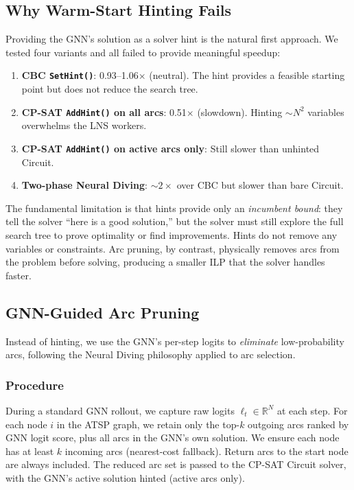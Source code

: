 \documentclass[conference]{IEEEtran}
\begin{document}
\subsection{Why Warm-Start Hinting Fails}\label{sec:hint_fail}

Providing the GNN's solution as a solver hint is the natural first approach. We tested four variants and all failed to provide meaningful speedup:

\begin{enumerate}
\item \textbf{CBC \texttt{SetHint()}}: 0.93--1.06$\times$ (neutral). The hint provides a feasible starting point but does not reduce the search tree.
\item \textbf{CP-SAT \texttt{AddHint()} on all arcs}: 0.51$\times$ (slowdown). Hinting ${\sim}N^2$ variables overwhelms the LNS workers.
\item \textbf{CP-SAT \texttt{AddHint()} on active arcs only}: Still slower than unhinted Circuit.
\item \textbf{Two-phase Neural Diving}: ${\sim}2\times$ over CBC but slower than bare Circuit.
\end{enumerate}

The fundamental limitation is that hints provide only an \emph{incumbent bound}: they tell the solver ``here is a good solution,'' but the solver must still explore the full search tree to prove optimality or find improvements. Hints do not remove any variables or constraints. Arc pruning, by contrast, physically removes arcs from the problem before solving, producing a smaller ILP that the solver handles faster.

\subsection{GNN-Guided Arc Pruning}

Instead of hinting, we use the GNN's per-step logits to \emph{eliminate} low-probability arcs, following the Neural Diving philosophy \cite{nair2021neural} applied to arc selection.

\subsubsection{Procedure} During a standard GNN rollout, we capture raw logits $\ell_t \in \mathbb{R}^N$ at each step. For each node $i$ in the ATSP graph, we retain only the top-$k$ outgoing arcs ranked by GNN logit score, plus all arcs in the GNN's own solution. We ensure each node has at least $k$ incoming arcs (nearest-cost fallback). Return arcs to the start node are always included. The reduced arc set is passed to the CP-SAT Circuit solver, with the GNN's active solution hinted (active arcs only).
\end{document}
